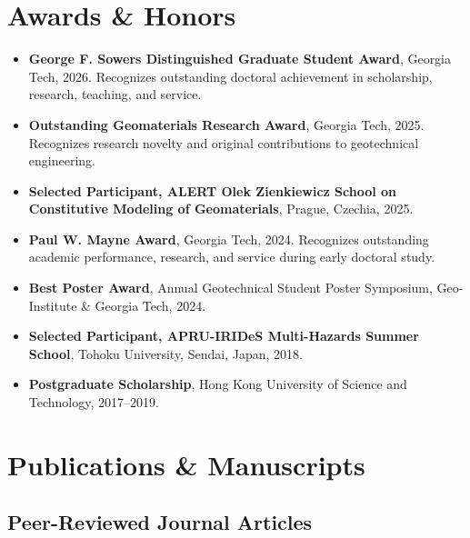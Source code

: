 \documentclass[10pt,letterpaper]{article}
\begin{document}
\section{Awards \& Honors}
\begin{itemize}[leftmargin=*, itemsep=2pt, topsep=2pt]
    \item \textbf{George F. Sowers Distinguished Graduate
    Student Award}, Georgia Tech, 2026.
    Recognizes outstanding doctoral achievement in
    scholarship, research, teaching, and service.

    \item \textbf{Outstanding Geomaterials Research Award},
    Georgia Tech, 2025.
    Recognizes research novelty and original
    contributions to geotechnical engineering.

    \item \textbf{Selected Participant, ALERT Olek
    Zienkiewicz School on Constitutive Modeling of
    Geomaterials}, Prague, Czechia, 2025.

    \item \textbf{Paul W. Mayne Award}, Georgia Tech, 2024.
    Recognizes outstanding academic performance,
    research, and service during early doctoral study.

    \item \textbf{Best Poster Award}, Annual Geotechnical
    Student Poster Symposium, Geo-Institute
    \& Georgia Tech, 2024.

    \item \textbf{Selected Participant, APRU-IRIDeS
    Multi-Hazards Summer School},
    Tohoku University, Sendai, Japan, 2018.

    \item \textbf{Postgraduate Scholarship},
    Hong Kong University of Science and Technology,
    2017--2019.
\end{itemize}

\section{Publications \& Manuscripts}
\subsection{Peer-Reviewed Journal Articles}
\end{document}
